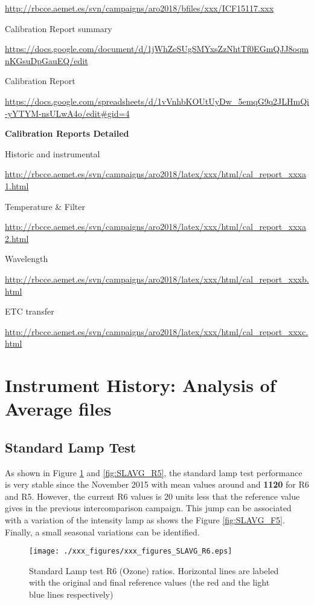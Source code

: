 \url{http://rbcce.aemet.es/svn/campaigns/aro2018/bfiles/xxx/ICF15117.xxx}

Calibration Report summary

\url{https://docs.google.com/document/d/1jWhZeSUgSMYxsZzNhtTf0EGmQJJ8oqmnKGsuDpGauEQ/edit}

Calibration Report

\url{https://docs.google.com/spreadsheets/d/1vVnhbKOUtUyDw_5emqG9q2JLHmQi-yYTYM-nsULwA4o/edit#gid=4}


\textbf{Calibration Reports Detailed}

Historic and instrumental

\url{http://rbcce.aemet.es/svn/campaigns/aro2018/latex/xxx/html/cal_report_xxxa1.html} 

Temperature \& Filter

\url{http://rbcce.aemet.es/svn/campaigns/aro2018/latex/xxx/html/cal_report_xxxa2.html}

Wavelength 

\url{http://rbcce.aemet.es/svn/campaigns/aro2018/latex/xxx/html/cal_report_xxxb.html}

ETC transfer

\url{http://rbcce.aemet.es/svn/campaigns/aro2018/latex/xxx/html/cal_report_xxxc.html} 


\clearpage




\section{Instrument History: Analysis of Average files} \label{sec:AVG}

\subsection{Standard Lamp Test} \label{subsec:SL}

As shown in Figure \ref{fig:SLAVG_R6} and \ref{fig:SLAVG_R5}, the standard lamp test performance is very stable since the November 2015 with mean values around \textbf{\slrefNEW} and \textbf{1120} for R6 and R5. However, the current R6 values is 20 units less that the reference value gives in the previous intercomparison campaign. This jump can be associated with a variation of the intensity lamp as shows the Figure \ref{fig:SLAVG_F5}.  Finally, a small seasonal variations can be identified.

\begin{figure}[hbtp!]
\begin{center}
     \texttt{[image: ./xxx\_figures/xxx\_figures\_SLAVG\_R6.eps]}
     \caption{Standard Lamp test R6 (Ozone) ratios. Horizontal lines are labeled with the original and final reference values (the red and the light blue lines respectively)}
	   \label{fig:SLAVG_R6}
\end{center}
\end{figure}


